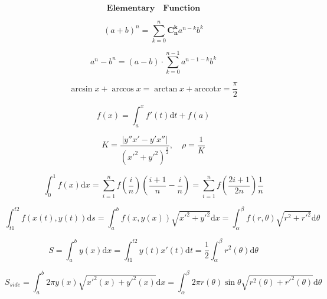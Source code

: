 \documentclass{article}
\begin{document}
    
\begin{displaymath}
    \bm{Elementary \quad Function}
\end{displaymath}

\begin{displaymath}
    (a+b)^n = \sum_{k=0}^n{\mathbf{C_{n}^{k}}a^{n-k}b^k}
\end{displaymath}

\begin{displaymath}
    a^{n}-b^{n} = (a-b) \cdot \sum_{k=0}^{n-1}a^{n-1-k}b^{k}
\end{displaymath}

\begin{displaymath}
    \arcsin x + \arccos x = \arctan x + \mathrm{arccot}x = \frac{\pi}{2} 
\end{displaymath}

\begin{displaymath}
    f(x) = \int_{a}^{x}f'(t) \mathrm{d}t + f(a)
\end{displaymath}

\begin{displaymath}
    K = \frac{|y''x'-y'x''|}{(x'^{2}+y'^{2})^{\frac{3}{2}}}, \quad \rho = \frac{1}{K}
\end{displaymath}

\begin{displaymath}
    \int_{0}^{1} f(x) \mathrm{d}x = \sum_{i=1}^{n}f\left(\frac{i}{n}\right)\left(\frac{i+1}{n}-\frac{i}{n}\right) = \sum_{i=1}^{n}f\left(\frac{2i+1}{2n}\right)\frac{1}{n}
\end{displaymath} 

\begin{displaymath}
    \int_{t1}^{t2} f(x(t),y(t)) \mathrm{d}s = \int_{a}^{b} f(x,y(x)) \sqrt{x'^2+y'^2} \mathrm{d}x = \int_{\alpha}^{\beta} f(r,\theta)\sqrt{r^2 + r'^2} \mathrm{d}\theta
\end{displaymath}

\begin{displaymath}
    S = \int_{a}^{b}y(x)\mathrm{d}x = \int_{t1}^{t2}y(t)x'(t)\mathrm{d}t = \frac{1}{2}\int_{\alpha}^{\beta}{r^2(\theta)}\mathrm{d}\theta 
\end{displaymath}

\begin{displaymath}
    S_{side} = \int_{a}^{b}2 \pi y(x)\sqrt{x'^2(x)+y'^2(x)} \mathrm{d}x = \int_{\alpha}^{\beta}{2\pi r(\theta)\sin \theta \sqrt{r^2(\theta)+r'^2(\theta)}} \mathrm{d}\theta 
\end{displaymath}
\end{document}
